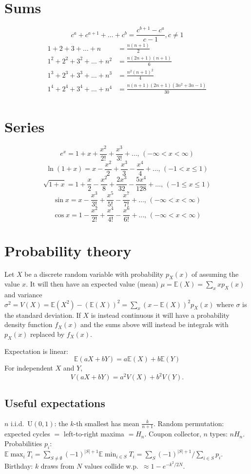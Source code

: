 \section{Sums}
\[ c^a + c^{a+1} + \dots + c^{b} = \frac{c^{b+1} - c^a}{c-1}, c \neq 1 \]
\begin{align*}
	1 + 2 + 3 + \dots + n &= \frac{n(n+1)}{2} \\
	1^2 + 2^2 + 3^2 + \dots + n^2 &= \frac{n(2n+1)(n+1)}{6} \\
	1^3 + 2^3 + 3^3 + \dots + n^3 &= \frac{n^2(n+1)^2}{4} \\
	1^4 + 2^4 + 3^4 + \dots + n^4 &= \frac{n(n+1)(2n+1)(3n^2 + 3n - 1)}{30} \\
\end{align*}

\section{Series}
$$e^x = 1+x+\frac{x^2}{2!}+\frac{x^3}{3!}+\dots,\,(-\infty<x<\infty)$$
$$\ln(1+x) = x-\frac{x^2}{2}+\frac{x^3}{3}-\frac{x^4}{4}+\dots,\,(-1<x\leq1)$$
$$\sqrt{1+x} = 1+\frac{x}{2}-\frac{x^2}{8}+\frac{2x^3}{32}-\frac{5x^4}{128}+\dots,\,(-1\leq x\leq1)$$
$$\sin x = x-\frac{x^3}{3!}+\frac{x^5}{5!}-\frac{x^7}{7!}+\dots,\,(-\infty<x<\infty)$$
$$\cos x = 1-\frac{x^2}{2!}+\frac{x^4}{4!}-\frac{x^6}{6!}+\dots,\,(-\infty<x<\infty)$$

\section{Probability theory}
Let $X$ be a discrete random variable with probability $p_X(x)$ of assuming the value $x$. It will then have an expected value (mean) $\mu=\mathbb{E}(X)=\sum_xxp_X(x)$ and variance $\sigma^2=V(X)=\mathbb{E}(X^2)-(\mathbb{E}(X))^2=\sum_x(x-\mathbb{E}(X))^2p_X(x)$ where $\sigma$ is the standard deviation. If $X$ is instead continuous it will have a probability density function $f_X(x)$ and the sums above will instead be integrals with $p_X(x)$ replaced by $f_X(x)$.

Expectation is linear:
\[\mathbb{E}(aX+bY) = a\mathbb{E}(X)+b\mathbb{E}(Y)\]
For independent $X$ and $Y$, \[V(aX+bY) = a^2V(X)+b^2V(Y).\]
\subsection{Useful expectations}
$n$ i.i.d.\ $\mathrm U(0,1)$: the $k$-th smallest has mean $\frac k{n+1}$. Random permutation: expected cycles $=$ left-to-right maxima $=H_n$.
Coupon collector, $n$ types: $nH_n$. Probabilities $p_i$: $\mathbb E\max_iT_i=\sum_{S\ne\emptyset}(-1)^{|S|+1}\mathbb E\min_{i\in S}T_i=\sum_S(-1)^{|S|+1}/\sum_{i\in S}p_i$.
Birthday: $k$ draws from $N$ values collide w.p.\ $\approx1-e^{-k^2/2N}$.


